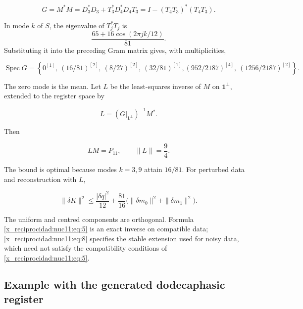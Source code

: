 \begin{equation}
G=M^*M=D_3^*D_3+T_3^*D_4^*D_4T_3
=I-(T_4T_3)^*(T_4T_3).
\label{x_reciprocidad:nuc11:eq:6}
\end{equation}



In mode \(k\) of \(S\), the eigenvalue of \(T_j^*T_j\) is
\[
 \frac{65+16\cos(2\pi jk/12)}{81}.
\]
Substituting it into the preceding Gram matrix gives, with multiplicities,



\begin{equation}
\operatorname{Spec}G=\left\{
0^{[1]},\ (16/81)^{[2]},\ (8/27)^{[2]},\ (32/81)^{[1]},
(952/2187)^{[4]},\ (1256/2187)^{[2]}\right\}.
\label{x_reciprocidad:nuc11:eq:7}
\end{equation}



The zero mode is the mean. Let \(L\) be the least-squares inverse of \(M\) on \(\mathbf1^\perp\), extended to the register space by



\[
L=(G|_{\mathbf1^\perp})^{-1}M^*.
\]



Then



\begin{equation}
LM=P_{11},\qquad \|L\|=\frac94.
\label{x_reciprocidad:nuc11:eq:8}
\end{equation}



The bound is optimal because modes \(k=3,9\) attain \(16/81\). For perturbed data and reconstruction with \(L\),



\begin{equation}
\|\delta K\|^2\le \frac{|\delta q|^2}{12}
+\frac{81}{16}\bigl(\|\delta m_0\|^2+\|\delta m_1\|^2\bigr).
\label{x_reciprocidad:nuc11:eq:9}
\end{equation}



The uniform and centred components are orthogonal. Formula \eqref{x_reciprocidad:nuc11:eq:5} is an exact inverse on compatible data; \eqref{x_reciprocidad:nuc11:eq:8} specifies the stable extension used for noisy data, which need not satisfy the compatibility conditions of \eqref{x_reciprocidad:nuc11:eq:5}.

\subsection{Example with the generated dodecaphasic register}

